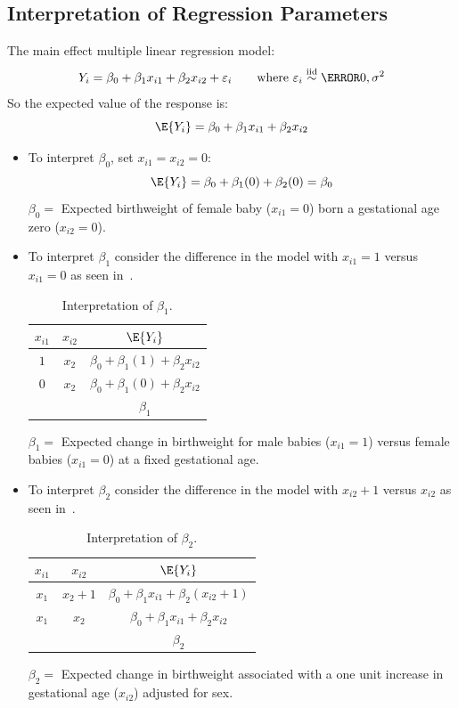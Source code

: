 \documentclass[oneside]{book}\usepackage[]{graphicx}\usepackage[svgnames]{xcolor}
\newcommand{\iid}{\overset{\text{iid}}{\sim}}%
\begin{document}
\subsection*{Interpretation of Regression Parameters}
The main effect multiple linear regression model:
\[ Y_i=\beta_0+\beta_1x_{i1}+\beta_2x_{i2}+\varepsilon_i\qquad\text{where $\varepsilon_i \iid\N{0,\sigma^2}$} \]
So the expected value of the response is:
\[ \E{Y_i}=\beta_0+\beta_1x_{i1}+\beta_2x_{i2} \]
\begin{itemize}
      \item To interpret $ \beta_0 $, set $ x_{i1}=x_{i2}=0 $:
            \[ \E{Y_i}=\beta_0+\beta_1(0)+\beta_2(0)=\beta_0 \]
            $ \beta_0= $ Expected birthweight of female baby ($ x_{i1}=0 $) born a gestational age zero ($ x_{i2}=0 $).
      \item To interpret $ \beta_1 $ consider the difference in the model with $ x_{i1}=1 $ versus $ x_{i1}=0 $
            as seen in~.
            \begin{table}[!htbp]
                  \centering
                  \begin{NiceTabular}{ccc}
                        $ x_{i1} $ & $ x_{i2} $ & $ \E{Y_i} $\\
                        \midrule
                        $ 1 $ & $ x_2 $ & $ \beta_0+\beta_1(1)+\beta_2x_{i2} $\\
                        $ 0 $ & $ x_2 $ & $ \beta_0+\beta_1(0)+\beta_2x_{i2} $\\
                        \midrule
                        && $ \beta_1 $
                  \end{NiceTabular}
                  \caption{Interpretation of $ \beta_1 $.}\label{interpretb1}
            \end{table}

            $ \beta_1 = $ Expected change in birthweight for male babies ($ x_{i1}=1 $) versus female
            babies ($ x_{i1}=0 $) at a fixed gestational age.
      \item To interpret $ \beta_2 $ consider the difference in the model with $ x_{i2}+1 $ versus $ x_{i2} $
            as seen in~.
            \begin{table}[!htbp]
                  \centering
                  \begin{NiceTabular}{ccc}
                        $ x_{i1} $ & $ x_{i2} $ & $ \E{Y_i} $\\
                        \midrule
                        $ x_1 $ & $ x_2+1 $ & $ \beta_0+\beta_1x_{i1}+\beta_2(x_{i2}+1) $\\
                        $ x_1 $ & $ x_2 $ & $ \beta_0+\beta_1x_{i1}+\beta_2x_{i2} $\\
                        \midrule
                        && $ \beta_2 $
                  \end{NiceTabular}
                  \caption{Interpretation of $ \beta_2 $.}\label{interpretb2}
            \end{table}

            $ \beta_2 = $ Expected change in birthweight associated with a one unit increase in gestational age ($ x_{i2} $) adjusted for sex.
\end{itemize}
\end{document}
